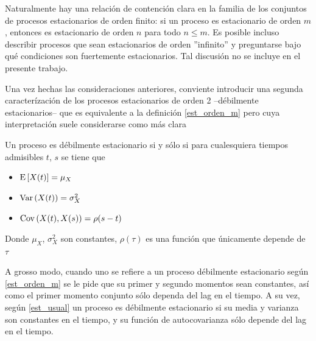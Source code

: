 Naturalmente hay una relaci\'on de contenci\'on clara en
la familia de los conjuntos de procesos estacionarios de orden finito:
si un proceso es estacionario de orden $m$, entonces es estacionario de orden $n$ para todo
$n \leq m$. Es posible incluso describir procesos que sean estacionarios de orden ''infinito''
y preguntarse bajo qu\'e condiciones son fuertemente estacionarios.
Tal discusi\'on no se incluye en el presente trabajo.


Una vez hechas
las consideraciones anteriores, conviente
introducir una segunda caracter\'izaci\'on de los procesos estacionarios de orden 2 --d\'ebilmente 
estacionarios--
que es equivalente
a la definici\'on \ref{est_orden_m} pero cuya interpretaci\'on suele considerarse como m\'as clara
\begin{thrm}
Un proceso es d\'ebilmente estacionario si y s\'olo si para cualesquiera tiempos admisibles
$t$, $s$ se tiene que
\begin{itemize}
\item $\mathrm{E}\left[ X(t) \right] = \mu_X$
\item $\mathrm{Var}\left( X(t) \right) = \sigma^{2}_X$
\item $\mathrm{Cov}\left( X(t),X(s) \right) = \rho (s-t)$
\end{itemize}
Donde $\mu_X$, $\sigma^{2}_X$ son constantes, $\rho(\tau)$
es una funci\'on que \'unicamente depende de $\tau$
\label{est_usual}
\end{thrm}

A grosso modo, cuando uno se refiere a un proceso d\'ebilmente estacionario seg\'un
\ref{est_orden_m} se le pide que su primer y segundo momentos sean constantes, as\'i como
el primer momento conjunto s\'olo dependa del lag en el tiempo. A su vez, seg\'un 
\ref{est_usual} un proceso es d\'ebilmente estacionario si su media y varianza son constantes en
el tiempo, y su funci\'on de autocovarianza s\'olo depende del lag en el tiempo.

